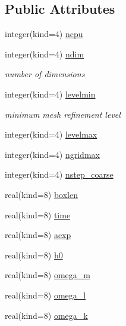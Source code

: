 \subsection*{Public Attributes}
\begin{DoxyCompactItemize}
\item 
integer(kind=4) \hyperlink{structmodconstant_1_1type__inforamses_a7267e8123e67211ef5ce2c51c1974148}{ncpu}
\item 
integer(kind=4) \hyperlink{structmodconstant_1_1type__inforamses_adf9bb7fc0490aa3a630c9fd7944148a0}{ndim}
\begin{DoxyCompactList}\small\item\em number of dimensions \end{DoxyCompactList}\item 
integer(kind=4) \hyperlink{structmodconstant_1_1type__inforamses_a2398bf44217d43e5b7809a095a5417ee}{levelmin}
\begin{DoxyCompactList}\small\item\em minimum mesh refinement level \end{DoxyCompactList}\item 
integer(kind=4) \hyperlink{structmodconstant_1_1type__inforamses_adef8da1578aa4bc629daa618087e153b}{levelmax}
\item 
integer(kind=4) \hyperlink{structmodconstant_1_1type__inforamses_a62f64ba9a767a47ca65c383b250c112b}{ngridmax}
\item 
integer(kind=4) \hyperlink{structmodconstant_1_1type__inforamses_a4ac1ad3a415d2865fb8b42e6fa6c2769}{nstep\+\_\+coarse}
\item 
real(kind=8) \hyperlink{structmodconstant_1_1type__inforamses_a836fde885c81b3643ee595c9eb63b19e}{boxlen}
\item 
real(kind=8) \hyperlink{structmodconstant_1_1type__inforamses_ac8a308775ea0956bafceff96094d659d}{time}
\item 
real(kind=8) \hyperlink{structmodconstant_1_1type__inforamses_a7e17a5532f8e65c4977fb71a8379006c}{aexp}
\item 
real(kind=8) \hyperlink{structmodconstant_1_1type__inforamses_a6ceaf1c28dc83b577f72b41e26d988e4}{h0}
\item 
real(kind=8) \hyperlink{structmodconstant_1_1type__inforamses_a57115a017792fc0c4a0f1c952e2efaa5}{omega\+\_\+m}
\item 
real(kind=8) \hyperlink{structmodconstant_1_1type__inforamses_a60ddbe95c4d1d55b91ca1237073fd776}{omega\+\_\+l}
\item 
real(kind=8) \hyperlink{structmodconstant_1_1type__inforamses_abd60017888939e8ef8e477f4022860ae}{omega\+\_\+k}

\end{DoxyCompactItemize}
